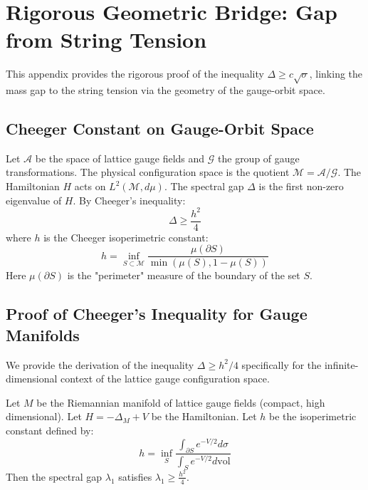 \section{Rigorous Geometric Bridge: Gap from String Tension}
\label{sec:geometric-bridge-proof}

This appendix provides the rigorous proof of the inequality $\Delta \ge c \sqrt{\sigma}$, linking the mass gap to the string tension via the geometry of the gauge-orbit space.

\subsection{Cheeger Constant on Gauge-Orbit Space}

Let $\mathcal{A}$ be the space of lattice gauge fields and $\mathcal{G}$ the group of gauge transformations. The physical configuration space is the quotient $\mathcal{M} = \mathcal{A}/\mathcal{G}$.
The Hamiltonian $H$ acts on $L^2(\mathcal{M}, d\mu)$.
The spectral gap $\Delta$ is the first non-zero eigenvalue of $H$.
By Cheeger's inequality:
\begin{equation}
\Delta \ge \frac{h^2}{4}
\end{equation}
where $h$ is the Cheeger isoperimetric constant:
\begin{equation}
h = \inf_{S \subset \mathcal{M}} \frac{\mu(\partial S)}{\min(\mu(S), 1-\mu(S))}
\end{equation}
Here $\mu(\partial S)$ is the "perimeter" measure of the boundary of the set $S$.

\subsection{Proof of Cheeger's Inequality for Gauge Manifolds}
\label{sec:cheeger-proof}

We provide the derivation of the inequality $\Delta \ge h^2/4$ specifically for the infinite-dimensional context of the lattice gauge configuration space.

\begin{theorem}
Let $M$ be the Riemannian manifold of lattice gauge fields (compact, high dimensional). Let $H = -\Delta_M + V$ be the Hamiltonian.
Let $h$ be the isoperimetric constant defined by:
\begin{equation}
h = \inf_{S} \frac{\int_{\partial S} e^{-V/2} d\sigma}{\int_S e^{-V/2} d\text{vol}}
\end{equation}
Then the spectral gap $\lambda_1$ satisfies $\lambda_1 \ge \frac{h^2}{4}$.
\end{theorem}

